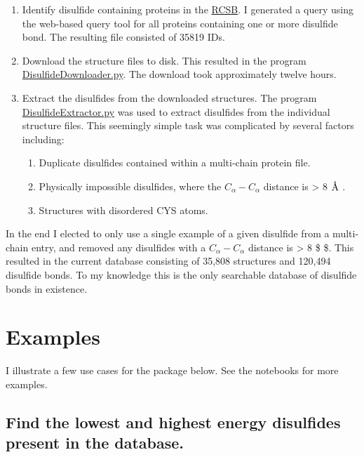 \begin{enumerate}
\def\labelenumi{\arabic{enumi}.}
\item
  Identify disulfide containing proteins in the
  \href{https://www.rcsb.org}{RCSB}. I generated a query using the
  web-based query tool for all proteins containing one or more disulfide
  bond. The resulting file consisted of 35819 IDs.
\item
  Download the structure files to disk. This resulted in the program
  \href{https://github.com/suchanek/proteusPy/blob/master/programs/DisulfideDownloader.py}{DisulfideDownloader.py}.
  The download took approximately twelve hours.
\item
  Extract the disulfides from the downloaded structures. The program
  \href{https://github.com/suchanek/proteusPy/blob/master/programs/DisulfideExtractor.py}{DisulfideExtractor.py}
  was used to extract disulfides from the individual structure files.
  This seemingly simple task was complicated by several factors
  including:

  \begin{enumerate}
  \def\labelenumii{\arabic{enumii}.}
  \tightlist
  \item
    Duplicate disulfides contained within a multi-chain protein file.
  \item
    Physically impossible disulfides, where the \(C_\alpha - C_\alpha\)
    distance is \textgreater{} 8 \(\text{\normalfont\AA}\) .
  \item
    Structures with disordered CYS atoms.
  \end{enumerate}
\end{enumerate}

In the end I elected to only use a single example of a given disulfide
from a multi-chain entry, and removed any disulfides with a
\(C_\alpha - C_\alpha\) distance is \textgreater{} 8
\$\text{\normalfont\AA} \$. This resulted in the current database
consisting of 35,808 structures and 120,494 disulfide bonds. To my
knowledge this is the only searchable database of disulfide bonds in
existence.

\hypertarget{examples}{%
\section{Examples}\label{examples}}

I illustrate a few use cases for the package below. See the notebooks
for more examples.

\hypertarget{find-the-lowest-and-highest-energy-disulfides-present-in-the-database.}{%
\subsection{Find the lowest and highest energy disulfides present in the
database.}\label{find-the-lowest-and-highest-energy-disulfides-present-in-the-database.}}

